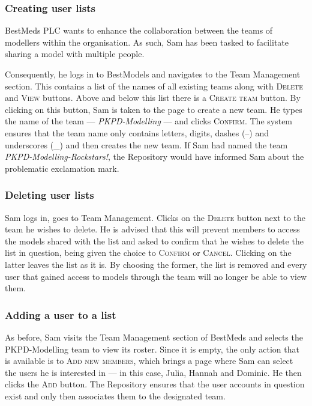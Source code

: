 \subsubsection{Creating user lists}
BestMeds PLC  wants to enhance the collaboration between the teams of modellers within the organisation. As such, Sam has been tasked to facilitate sharing a model with multiple people.

Consequently, he logs in to BestModels and navigates to the Team Management section. This contains a list of the names of all existing teams along with \textsc{Delete} and \textsc{View} buttons. Above and below this list there is a \textsc{Create team} button. By clicking on this button, Sam is taken to the page to create a new team. He types the name of the team --- \emph{PKPD-Modelling} --- and clicks \textsc{Confirm}. The system ensures that the team name only contains letters, digits, dashes (--) and underscores (\_) and then creates the new team. If Sam had named the team \emph{PKPD-Modelling-Rockstars!}, the Repository would have informed Sam about the problematic exclamation mark.

\subsubsection{Deleting user lists}

Sam logs in, goes to Team Management. Clicks on the \textsc{Delete} button next to the team he wishes to delete. He is advised that this will prevent members to access the models shared with the list and asked to confirm that he wishes to delete the list in question, being given the choice to \textsc{Confirm} or \textsc{Cancel}. Clicking on the latter leaves the list as it is. By choosing the former, the list is removed and every user that gained access to models through the team will no longer be able to view them.

\subsubsection{Adding a user to a list}
As before, Sam visits the Team Management section of BestMeds and selects the PKPD-Modelling team to view its roster. Since it is empty, the only action that is available is to \textsc{Add new members}, which brings a page where Sam can select the users he is interested in --- in this case, Julia, Hannah and Dominic. He then clicks the \textsc{Add} button. The Repository ensures that the user accounts in question exist and only then associates them to the designated team.

